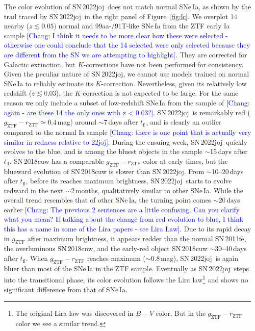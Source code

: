 \documentclass[twocolumn]{aastex631}
\newcommand{\sn}{SN\,2022joj}
\newcommand{\tfl}{$t_\mathrm{fl}$}
\newcommand{\chang}[1]{\textcolor{blue}{[Chang: #1]}}
\begin{document}
\begin{CJK*}{UTF8}{gbsn}
The color evolution of \sn\ does not match normal SNe\,Ia, as shown by the trail traced by \sn\ in the right panel of Figure~\ref{fig:lc}. We overplot 14 nearby ($z\lesssim0.05$) normal and 99aa-/91T-like SNe\,Ia from the ZTF early Ia sample \citep{Bulla2020} \chang{I think it needs to be more clear how these were selected - otherwise one could conclude that the 14 selected were only selected because they are different from the SN we are attempting to highlight}. They are corrected for Galactic extinction, but $K$-corrections have not been performed for consistency. Given the peculiar nature of \sn, we cannot use models trained on normal SNe\,Ia to reliably estimate its $K$-correction. Nevertheless, given its relatively low redshift ($z\lesssim0.03$), the $K$-correction is not expected to be large. For the same reason we only include a subset of low-redshift SNe\,Ia from the sample of \citet{Bulla2020} \chang{again - are these 14 the only ones with z < 0.03?}. \sn\ is remarkably red ($g_\mathrm{ZTF} - r_\mathrm{ZTF}\simeq0.4$\,mag) around $\sim$7\,days after $t_\mathrm{fl}$, and is clearly an outlier compared to the normal Ia sample \chang{there is one point that is actually very similar in redness relative to 22joj}. During the ensuing week, \sn\ quickly evolves to the blue, and is among the bluest objects in the sample $\sim$15\,days after $t_\mathrm{fl}$. SN\,2018cuw has a comparable $g_\mathrm{ZTF} - r_\mathrm{ZTF}$ color at early times, but the blueward evolution of SN\,2018cuw is slower than \sn. From $\sim$10--20\,days after \tfl, before its reaches maximum brightness, \sn\ starts to evolve redward in the next $\sim$2\,months, qualitatively similar to other SNe\,Ia. While the overall trend resembles that of other SNe\,Ia, the turning point comes $\sim$20\,days earlier \chang{The previous 2 sentences are a little confusing. Can you clarify what you mean? If talking about the change from red evolution to blue, I think this has a name in some of the Lira papers - see Lira Law}. Due to its rapid decay in $g_\mathrm{ZTF}$ after maximum brightness, it appears redder than the normal SN\,2011fe, the overluminous SN\,2018cnw, and the early-red object SN\,2018cuw $\sim$30--40\,days after \tfl. When $g_\mathrm{ZTF} - r_\mathrm{ZTF}$ reaches maximum ($\sim$0.8\,mag), \sn\ is again bluer than most of the SNe\,Ia in the ZTF sample. Eventually as \sn\ steps into the transitional phase, its color evolution follows the Lira law\footnote{The original Lira law was discovered in $B-V$ color. But in the $g_\mathrm{ZTF}-r_\mathrm{ZTF}$ color we see a similar trend.} \citep{Lira_1996,Phillips_1999} and shows no significant difference from that of SNe\,Ia.


\end{CJK*}
\end{document}
